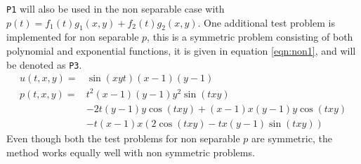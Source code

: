 \texttt{P1} will also be used in the non separable case with $p(t) = f_1(t) g_1(x,y) + f_2(t) g_2(x,y)$.
One additional test problem is implemented for non separable $p$, this is a symmetric problem consisting of both polynomial and exponential functions, it is given in equation \eqref{eqn:non1}, and will be denoted as \texttt{P3}.
\begin{equation} \label{eqn:non1}
\begin{aligned}
 u(t,x,y) = & \sin(x y t) (x-1) (y-1)\\
 p(t,x,y) = & t^2 (x-1) (y-1) y^2 \sin(t x y)\\ & -2 t (y-1) y \cos(t x y)+(x-1) x (y-1) y \cos(t x y)\\ & -t (x-1) x (2 \cos(t x y)-t x (y-1) \sin(t x y))
\end{aligned}
\end{equation}
Even though both the test problems for non separable $p$ are symmetric, the method works equally well with non symmetric problems. 
